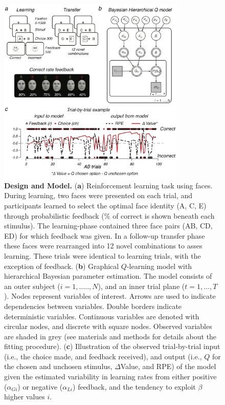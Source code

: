 \documentclass[]{article}
\begin{document}
\begin{figure}
\centering
\includegraphics[width=0.8\textwidth,height=\textheight]{_png/Figure1.png}
\caption{\textbf{Design and Model.} (\textbf{a}) Reinforcement learning
task using faces. During learning, two faces were presented on each
trial, and participants learned to select the optimal face identity (A,
C, E) through probabilistic feedback (\% of correct is shown beneath
each stimulus). The learning-phase contained three face pairs (AB, CD,
ED) for which feedback was given. In a follow-up transfer phase these
faces were rearranged into 12 novel combinations to asses learning.
These trials were identical to learning trials, with the exception of
feedback. (\textbf{b}) Graphical \(Q\)-learning model with hierarchical
Bayesian parameter estimation. The model consists of an outer subject
(\(i=1,…..,N\)), and an inner trial plane (\(t=1,…,T\)). Nodes represent
variables of interest. Arrows are used to indicate dependencies between
variables. Double borders indicate deterministic variables. Continuous
variables are denoted with circular nodes, and discrete with square
nodes. Observed variables are shaded in grey (see materials and methods
for details about the fitting procedure). (\textbf{c}) Illustration of
the observed trial-by-trial input (i.e., the choice made, and feedback
received), and output (i.e., \(Q\) for the chosen and unchosen stimulus,
\(\Delta\)Value, and RPE) of the model given the estimated variability
in learning rates from either positive (\(\alpha_{Gi}\)) or negative
(\(\alpha_{Li}\)) feedback, and the tendency to exploit \(\beta\) higher
values \(i\). \label{Figure 1}}
\end{figure}
\end{document}
